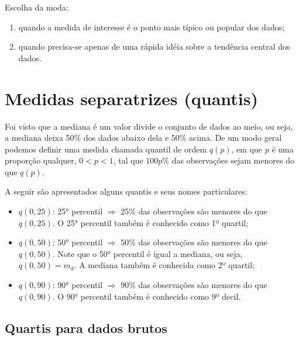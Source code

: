 \documentclass[11pt,fleqn]{book} %
\begin{document}
\noindent Escolha da moda:
\begin{enumerate}
\item quando a medida de interesse é o ponto mais típico ou popular dos dados;
\item quando precisa-se apenas de uma rápida idéia sobre a tendência central dos dados. \\
\end{enumerate}



\section{Medidas separatrizes (quantis)}

Foi visto que a mediana é um valor divide o conjunto de dados ao meio, ou seja, a mediana deixa 50\% dos dados abaixo dela e 50\% acima. De um modo geral podemos definir uma medida chamada quantil de ordem $q(p)$, em que $p$ é uma proporção qualquer, $0<p<1$, tal que $100p\%$ das observações sejam menores do que $q(p)$. \\

\begin{example}

A seguir são apresentados alguns quantis e seus nomes particulares: \\

\begin{itemize}

\item $q(0,25)$: 25° percentil $\Rightarrow$ 25\% das observações são menores do que $q(0,25)$. O 25° percentil também é conhecido como 1º quartil;

\item $q(0,50)$: 50° percentil $\Rightarrow$ 50\% das observações são menores do que $q(0,50)$. Note que o 50° percentil é igual a mediana, ou seja, $q(0,50)=m_d$. A mediana também é conhecida como 2º quartil;

\item $q(0,90)$: 90° percentil $\Rightarrow$ 90\% das observações são menores do que $q(0,90)$. O 90° percentil também é conhecido como 9º decil.

\end{itemize}
		

\end{example}

\vspace{0,3cm}


\subsection{Quartis para dados brutos}
\end{document}
